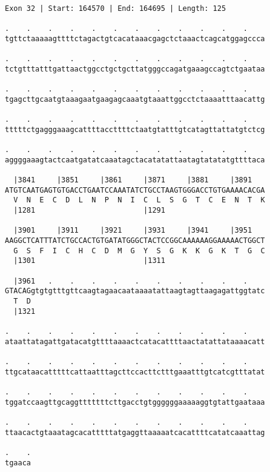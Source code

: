 \documentclass{article}
\begin{document}
\begin{Verbatim}
Exon 32 | Start: 164570 | End: 164695 | Length: 125
 
.    .    .    .    .    .    .    .    .    .    .    .    
tgttctaaaaagttttctagactgtcacataaacgagctctaaactcagcatggagccca
  
.    .    .    .    .    .    .    .    .    .    .    .    
tctgtttatttgattaactggcctgctgcttatgggccagatgaaagccagtctgaataa
  
.    .    .    .    .    .    .    .    .    .    .    .    
tgagcttgcaatgtaaagaatgaagagcaaatgtaaattggcctctaaaatttaacattg
  
.    .    .    .    .    .    .    .    .    .    .    .    
tttttctgagggaaagcattttaccttttctaatgtatttgtcatagttattatgtctcg
  
.    .    .    .    .    .    .    .    .    .    .    .    
aggggaaagtactcaatgatatcaaatagctacatatattaatagtatatatgttttaca
  
  |3841     |3851     |3861     |3871     |3881     |3891   
ATGTCAATGAGTGTGACCTGAATCCAAATATCTGCCTAAGTGGGACCTGTGAAAACACGA
  V  N  E  C  D  L  N  P  N  I  C  L  S  G  T  C  E  N  T  K
  |1281                         |1291                       
  
  |3901     |3911     |3921     |3931     |3941     |3951   
AAGGCTCATTTATCTGCCACTGTGATATGGGCTACTCCGGCAAAAAAGGAAAAACTGGCT
  G  S  F  I  C  H  C  D  M  G  Y  S  G  K  K  G  K  T  G  C
  |1301                         |1311                       
  
  |3961   .    .    .    .    .    .    .    .    .    .    
GTACAGgtgtgtttgttcaagtagaacaataaaatattaagtagttaagagattggtatc
  T  D                                                      
  |1321                                                     
  
.    .    .    .    .    .    .    .    .    .    .    .    
ataattatagattgatacatgttttaaaactcatacattttaactatattataaaacatt
  
.    .    .    .    .    .    .    .    .    .    .    .    
ttgcataacatttttcattaatttagcttccacttctttgaaatttgtcatcgtttatat
  
.    .    .    .    .    .    .    .    .    .    .    .    
tggatccaagttgcaggtttttttcttgacctgtggggggaaaaaggtgtattgaataaa
  
.    .    .    .    .    .    .    .    .    .    .    .    
ttaacactgtaaatagcacatttttatgaggttaaaaatcacattttcatatcaaattag
  
.    .
tgaaca
\end{Verbatim}
\newpage
\end{document}
